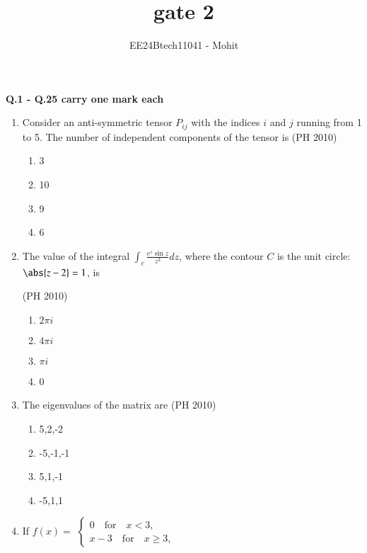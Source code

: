 \documentclass[journal,12pt,onecolumn]{IEEEtran}
\theoremstyle{remark}
\begin{document}
\title{gate 2}
\author{EE24Btech11041 - Mohit}
\maketitle
\renewcommand{\thefigure}{\theenumi}
\renewcommand{\thetable}{\theenumi}



\textbf{Q.1 - Q.25 carry one mark each}
\begin{enumerate}
\item Consider an anti-symmetric tensor $P_{ij}$ with the indices $i$ and $j$ running from 1 to 5. The number of independent components of the tensor is 
\hfill{(PH 2010)}
\begin{multicols}{4}
\begin{enumerate}
\item 3
\item 10
\item 9 
\item 6
\end{enumerate}
\end{multicols}
\item The value of the integral $\int_{c} \frac {e^z \sin{z}}{z^2}dz$, where the contour $C$ is the unit circle:
$\abs{z-2}=1$, is

\hfill{(PH 2010)}
\begin{multicols}{4}
\begin{enumerate}
\item $2\pi i$
\item $4\pi i$
\item $\pi i$
\item 0
\end{enumerate}
\end{multicols}

\item The eigenvalues of the matrix 
are 
\hfill{(PH 2010)}
\begin{multicols}{4}
\begin{enumerate}
\item 5,2,-2
\item -5,-1,-1
\item 5,1,-1
\item -5,1,1
\end{enumerate}
\end{multicols}
\item If 
$f(x) =$ 
$\begin{cases} 
0 \quad \text{for} \quad x < 3, \\ 
x - 3 \quad \text{for} \quad x \geq 3, 
\end{cases}$


\end{enumerate}
\end{document}
